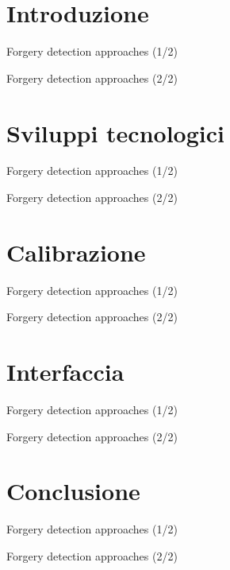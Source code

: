 \documentclass{beamer}
\title[\today]{}
\author{Edoardo D'Angelis}
\date{\today}
\begin{document}
\frame{\titlepage}


\section{Introduzione}
\begin{frame}{Forgery detection approaches (1/2)}
\end{frame}
\begin{frame}{Forgery detection approaches (2/2)}
\end{frame}

\section{Sviluppi tecnologici}
\begin{frame}{Forgery detection approaches (1/2)}
\end{frame}
\begin{frame}{Forgery detection approaches (2/2)}
\end{frame}

\section{Calibrazione}
\begin{frame}{Forgery detection approaches (1/2)}
\end{frame}
\begin{frame}{Forgery detection approaches (2/2)}
\end{frame}

\section{Interfaccia}
\begin{frame}{Forgery detection approaches (1/2)}
\end{frame}
\begin{frame}{Forgery detection approaches (2/2)}
\end{frame}

\section{Conclusione}
\begin{frame}{Forgery detection approaches (1/2)}
\end{frame}
\begin{frame}{Forgery detection approaches (2/2)}
\end{frame}
\end{document}
